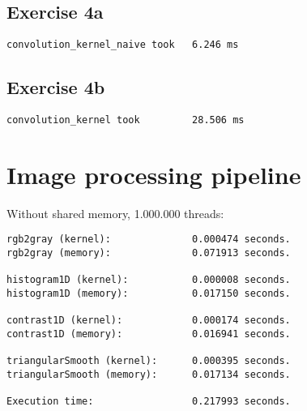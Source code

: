 \documentclass[a4paper]{article}
\begin{document}
\subsection{Exercise 4a}

\begin{verbatim}
convolution_kernel_naive took   6.246 ms
\end{verbatim}

\subsection{Exercise 4b}

\begin{verbatim}
convolution_kernel took         28.506 ms
\end{verbatim}

\section{Image processing pipeline}

Without shared memory, 1.000.000 threads:

\begin{verbatim}
rgb2gray (kernel):              0.000474 seconds.
rgb2gray (memory):              0.071913 seconds.

histogram1D (kernel):           0.000008 seconds.
histogram1D (memory):           0.017150 seconds.

contrast1D (kernel):            0.000174 seconds.
contrast1D (memory):            0.016941 seconds.

triangularSmooth (kernel):      0.000395 seconds.
triangularSmooth (memory):      0.017134 seconds.

Execution time:                 0.217993 seconds. 		
\end{verbatim}
\end{document}
